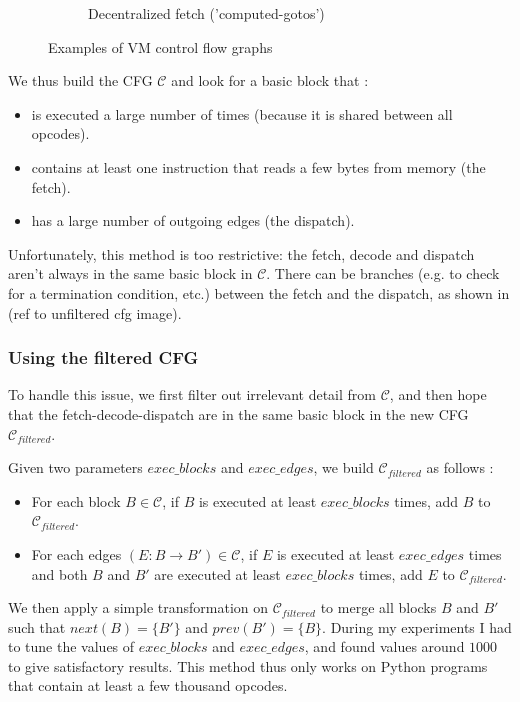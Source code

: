\documentclass[english]{article}
\begin{document}
\begin{figure}[htp]
\begin{subfigure}{.5\textwidth}
		\caption{Decentralized fetch ('computed-gotos')}
		\label{fig:abstractVM:Decentralized}
	\end{subfigure}
	\caption{Examples of VM control flow graphs}
	\label{fig:abstractVM}
\end{figure}

We thus build the CFG $\mathcal{C}$ and look for a basic block that :
\begin{itemize}
	\item is executed a large number of times (because it is shared between all opcodes).
	\item contains at least one instruction that reads a few bytes from memory (the fetch).
	\item has a large number of outgoing edges (the dispatch).
\end{itemize} 

Unfortunately, this method is too restrictive: the fetch, decode and dispatch aren't always in the same basic block in $\mathcal{C}$. There can be branches (e.g. to check for a termination condition, etc.) between the fetch and the dispatch, as shown in (ref to unfiltered cfg image). 

\subsubsection{Using the filtered CFG}

To handle this issue, we first filter out irrelevant detail from $\mathcal{C}$, and then hope that the fetch-decode-dispatch are in the same basic block in the new CFG $\mathcal{C}_{filtered}$. 

Given two parameters $exec\_blocks$ and $exec\_edges$, we build $\mathcal{C}_{filtered}$ as follows : 
\begin{itemize}
	\item For each block $B \in \mathcal{C}$, if $B$ is executed at least $exec\_blocks$ times, add $B$ to $\mathcal{C}_{filtered}$.
	\item For each edges $(E: B \rightarrow B') \in \mathcal{C}$, if $E$ is executed at least $exec\_edges$ times and both $B$ and $B'$ are executed at least $exec\_blocks$ times, add $E$ to $\mathcal{C}_{filtered}$.
\end{itemize}
We then apply a simple transformation on $\mathcal{C}_{filtered}$ to merge all blocks $B$ and $B'$ such that $next(B) = \{B'\}$ and $prev(B') = \{B\}$. During my experiments I had to tune the values of $exec\_blocks$ and $exec\_edges$, and found values around $1000$ to give satisfactory results. This method thus only works on Python programs that contain at least a few thousand opcodes.
\end{document}
